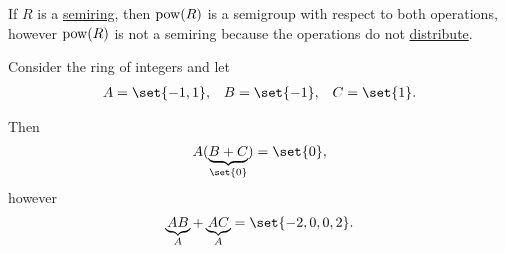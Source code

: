 \begin{example}
\begin{thmenum}
    If \( R \) is a \hyperref[def:semiring]{semiring}, then \( \operatorname{pow}(R) \) is a semigroup with respect to both operations, however \( \operatorname{pow}(R) \) is not a semiring because the operations do not \hyperref[def:semiring/left_distributivity]{distribute}.

    Consider the ring of integers and let
    \begin{align*}
      A = \set{ -1, 1 },
      &&
      B = \set{ -1 },
      &&
      C = \set{ 1 }.
    \end{align*}

    Then
    \begin{equation*}
      A(\underbrace{B + C}_{\set{ 0 }})
      =
      \set{ 0 },
    \end{equation*}
    however
    \begin{equation*}
      \underbrace{AB}_{A} + \underbrace{AC}_{A}
      =
      \set{ -2, 0, 0, 2 }.
    \end{equation*}
  \end{thmenum}
\end{example}

